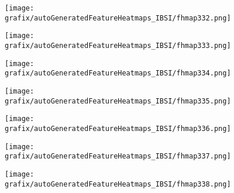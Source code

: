 \hspace{\hsp} 
\begin{subfigure}{\wid\textwidth} 
    \centering 
    \caption{\tiny \sffamily {}} 
    \vspace{\vsp} 
    \texttt{[image: grafix/autoGeneratedFeatureHeatmaps\_IBSI/fhmap332.png]} 
\end{subfigure} 
\hspace{\hsp} 
\begin{subfigure}{\wid\textwidth} 
    \centering 
    \caption{\tiny \sffamily {}} 
    \vspace{\vsp} 
    \texttt{[image: grafix/autoGeneratedFeatureHeatmaps\_IBSI/fhmap333.png]} 
\end{subfigure} 
\hspace{\hsp} 
\begin{subfigure}{\wid\textwidth} 
    \centering 
    \caption{\tiny \sffamily {}} 
    \vspace{\vsp} 
    \texttt{[image: grafix/autoGeneratedFeatureHeatmaps\_IBSI/fhmap334.png]} 
\end{subfigure} 
\hspace{\hsp} 
\begin{subfigure}{\wid\textwidth} 
    \centering 
    \caption{\tiny \sffamily {}} 
    \vspace{\vsp} 
    \texttt{[image: grafix/autoGeneratedFeatureHeatmaps\_IBSI/fhmap335.png]} 
\end{subfigure} 
\hspace{\hsp} 
\begin{subfigure}{\wid\textwidth} 
    \centering 
    \caption{\tiny \sffamily {}} 
    \vspace{\vsp} 
    \texttt{[image: grafix/autoGeneratedFeatureHeatmaps\_IBSI/fhmap336.png]} 
\end{subfigure} 
\hspace{\hsp} 
\begin{subfigure}{\wid\textwidth} 
    \centering 
    \caption{\tiny \sffamily {}} 
    \vspace{\vsp} 
    \texttt{[image: grafix/autoGeneratedFeatureHeatmaps\_IBSI/fhmap337.png]} 
\end{subfigure} 
\hspace{\hsp} 
\begin{subfigure}{\wid\textwidth} 
    \centering 
    \caption{\tiny \sffamily {}} 
    \vspace{\vsp} 
    \texttt{[image: grafix/autoGeneratedFeatureHeatmaps\_IBSI/fhmap338.png]} 
\end{subfigure} 

